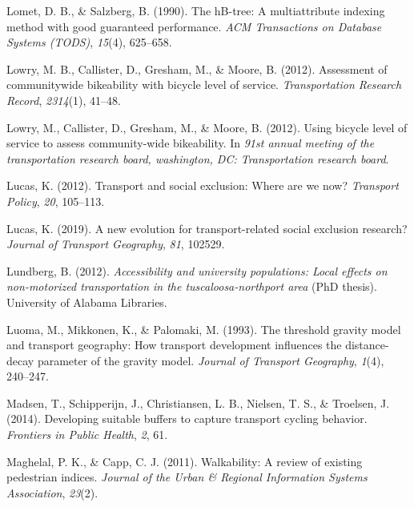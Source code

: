 \documentclass[12pt,twoside]{reedthesis}
\newlength{\cslhangindent}
\newenvironment{CSLReferences}[2] %
 {%
  \setlength{\parindent}{0pt}
  \ifodd #1 \everypar{\setlength{\hangindent}{\cslhangindent}}\ignorespaces\fi
  \ifnum #2 > 0
  \setlength{\parskip}{#2\baselineskip}
  \fi
 }%
 {}
\begin{document}
\begin{CSLReferences}{1}{0}
\leavevmode{}%
Lomet, D. B., \& Salzberg, B. (1990). The hB-tree: A multiattribute indexing method with good guaranteed performance. \emph{ACM Transactions on Database Systems (TODS)}, \emph{15}(4), 625--658.

\leavevmode{}%
Lowry, M. B., Callister, D., Gresham, M., \& Moore, B. (2012). Assessment of communitywide bikeability with bicycle level of service. \emph{Transportation Research Record}, \emph{2314}(1), 41--48.

\leavevmode{}%
Lowry, M., Callister, D., Gresham, M., \& Moore, B. (2012). Using bicycle level of service to assess community-wide bikeability. In \emph{91st annual meeting of the transportation research board, washington, DC: Transportation research board}.

\leavevmode{}%
Lucas, K. (2012). Transport and social exclusion: Where are we now? \emph{Transport Policy}, \emph{20}, 105--113.

\leavevmode{}%
Lucas, K. (2019). A new evolution for transport-related social exclusion research? \emph{Journal of Transport Geography}, \emph{81}, 102529.

\leavevmode{}%
Lundberg, B. (2012). \emph{Accessibility and university populations: Local effects on non-motorized transportation in the tuscaloosa-northport area} (PhD thesis). University of Alabama Libraries.

\leavevmode{}%
Luoma, M., Mikkonen, K., \& Palomaki, M. (1993). The threshold gravity model and transport geography: How transport development influences the distance-decay parameter of the gravity model. \emph{Journal of Transport Geography}, \emph{1}(4), 240--247.

\leavevmode{}%
Madsen, T., Schipperijn, J., Christiansen, L. B., Nielsen, T. S., \& Troelsen, J. (2014). Developing suitable buffers to capture transport cycling behavior. \emph{Frontiers in Public Health}, \emph{2}, 61.

\leavevmode{}%
Maghelal, P. K., \& Capp, C. J. (2011). Walkability: A review of existing pedestrian indices. \emph{Journal of the Urban \& Regional Information Systems Association}, \emph{23}(2).


\end{CSLReferences}
\end{document}
